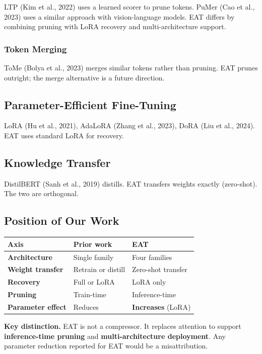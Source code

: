 LTP (Kim et al., 2022) uses a learned scorer to prune tokens. PuMer (Cao et 
al., 2023) uses a similar approach with vision-language models. EAT differs 
by combining pruning with LoRA recovery and multi-architecture support.

\subsubsection{Token Merging}

ToMe (Bolya et al., 2023) merges similar tokens rather than pruning. EAT 
prunes outright; the merge alternative is a future direction.

\subsection{Parameter-Efficient Fine-Tuning}

LoRA (Hu et al., 2021), AdaLoRA (Zhang et al., 2023), DoRA (Liu et al., 2024). 
EAT uses standard LoRA for recovery.

\subsection{Knowledge Transfer}

DistilBERT (Sanh et al., 2019) distills. EAT transfers weights exactly 
(zero-shot). The two are orthogonal.

\subsection{Position of Our Work}

\begin{table}[H]
\centering
\small
\begin{tabular}{lll}
\toprule
\textbf{Axis} & \textbf{Prior work} & \textbf{EAT} \\
\midrule
\textbf{Architecture} & Single family & Four families \\
\textbf{Weight transfer} & Retrain or distill & Zero-shot transfer \\
\textbf{Recovery} & Full or LoRA & LoRA only \\
\textbf{Pruning} & Train-time & Inference-time \\
\textbf{Parameter effect} & Reduces & \textbf{Increases} (LoRA) \\
\bottomrule
\end{tabular}
\end{table}

\textbf{Key distinction.} EAT is not a compressor. It replaces attention to 
support \textbf{inference-time pruning} and \textbf{multi-architecture deployment}. 
Any parameter reduction reported for EAT would be a misattribution.

